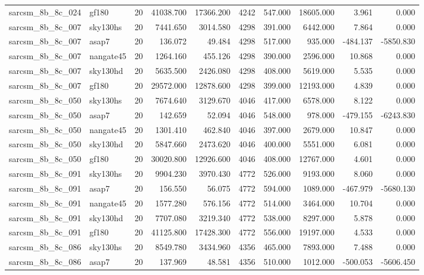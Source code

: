 \documentclass{article}
\begin{document}
\begin{longtable}{llrrrrrrrr}
sarcsm\_8b\_8c\_024 & gf180 & 20 & 41038.700 & 17366.200 & 4242 & 547.000 & 18605.000 & 3.961 & 0.000 \\
sarcsm\_8b\_8c\_007 & sky130hs & 20 & 7441.650 & 3014.580 & 4298 & 391.000 & 6442.000 & 7.864 & 0.000 \\
sarcsm\_8b\_8c\_007 & asap7 & 20 & 136.072 & 49.484 & 4298 & 517.000 & 935.000 & -484.137 & -5850.830 \\
sarcsm\_8b\_8c\_007 & nangate45 & 20 & 1264.160 & 455.126 & 4298 & 390.000 & 2596.000 & 10.868 & 0.000 \\
sarcsm\_8b\_8c\_007 & sky130hd & 20 & 5635.500 & 2426.080 & 4298 & 408.000 & 5619.000 & 5.535 & 0.000 \\
sarcsm\_8b\_8c\_007 & gf180 & 20 & 29572.000 & 12878.600 & 4298 & 399.000 & 12193.000 & 4.839 & 0.000 \\
sarcsm\_8b\_8c\_050 & sky130hs & 20 & 7674.640 & 3129.670 & 4046 & 417.000 & 6578.000 & 8.122 & 0.000 \\
sarcsm\_8b\_8c\_050 & asap7 & 20 & 142.659 & 52.094 & 4046 & 548.000 & 978.000 & -479.155 & -6243.830 \\
sarcsm\_8b\_8c\_050 & nangate45 & 20 & 1301.410 & 462.840 & 4046 & 397.000 & 2679.000 & 10.847 & 0.000 \\
sarcsm\_8b\_8c\_050 & sky130hd & 20 & 5847.660 & 2473.620 & 4046 & 400.000 & 5551.000 & 6.081 & 0.000 \\
sarcsm\_8b\_8c\_050 & gf180 & 20 & 30020.800 & 12926.600 & 4046 & 408.000 & 12767.000 & 4.601 & 0.000 \\
sarcsm\_8b\_8c\_091 & sky130hs & 20 & 9904.230 & 3970.430 & 4772 & 526.000 & 9193.000 & 8.060 & 0.000 \\
sarcsm\_8b\_8c\_091 & asap7 & 20 & 156.550 & 56.075 & 4772 & 594.000 & 1089.000 & -467.979 & -5680.130 \\
sarcsm\_8b\_8c\_091 & nangate45 & 20 & 1577.280 & 576.156 & 4772 & 514.000 & 3464.000 & 10.704 & 0.000 \\
sarcsm\_8b\_8c\_091 & sky130hd & 20 & 7707.080 & 3219.340 & 4772 & 538.000 & 8297.000 & 5.878 & 0.000 \\
sarcsm\_8b\_8c\_091 & gf180 & 20 & 41125.800 & 17428.300 & 4772 & 556.000 & 19197.000 & 4.533 & 0.000 \\
sarcsm\_8b\_8c\_086 & sky130hs & 20 & 8549.780 & 3434.960 & 4356 & 465.000 & 7893.000 & 7.488 & 0.000 \\
sarcsm\_8b\_8c\_086 & asap7 & 20 & 137.969 & 48.581 & 4356 & 510.000 & 1012.000 & -500.053 & -5606.450 \\

\end{longtable}
\end{document}
